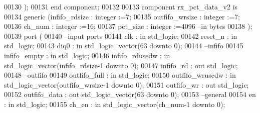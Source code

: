 \begin{DoxyCode}
00130         );
00131 \textcolor{keywordflow}{end} \textcolor{keywordflow}{component};
00132 
00133 \textcolor{keywordflow}{component} rx_pct_data_v2 \textcolor{keywordflow}{is}
00134   \textcolor{keywordflow}{generic} (infifo_rdsize  : \textcolor{comment}{integer} :=\textcolor{vhdllogic}{}\textcolor{vhdllogic}{7};
00135            outfifo_wrsize : \textcolor{comment}{integer} :=\textcolor{vhdllogic}{}\textcolor{vhdllogic}{7};
00136            ch_num         : \textcolor{comment}{integer} :=\textcolor{vhdllogic}{}\textcolor{vhdllogic}{16};
00137            pct_size       : \textcolor{comment}{integer} :=\textcolor{vhdllogic}{}\textcolor{vhdllogic}{4096}\textcolor{keyword}{ --in bytes}
00138             );
00139   \textcolor{keywordflow}{port} (
00140 \textcolor{keyword}{        --input ports }
00141         clk             : \textcolor{keywordflow}{in} \textcolor{comment}{std\_logic};
00142         reset_n         : \textcolor{keywordflow}{in} \textcolor{comment}{std\_logic};
00143         diq0            : \textcolor{keywordflow}{in} \textcolor{comment}{std\_logic\_vector}(\textcolor{vhdllogic}{}\textcolor{vhdllogic}{63} \textcolor{keywordflow}{downto} \textcolor{vhdllogic}{}\textcolor{vhdllogic}{0});
00144 \textcolor{keyword}{        --infifo}
00145         infifo_empty    : \textcolor{keywordflow}{in} \textcolor{comment}{std\_logic}; 
00146         infifo_rdusedw  : \textcolor{keywordflow}{in} \textcolor{comment}{std\_logic\_vector}(infifo_rdsize\textcolor{vhdlchar}{-}\textcolor{vhdllogic}{}\textcolor{vhdllogic}{1} \textcolor{keywordflow}{downto} \textcolor{vhdllogic}{}\textcolor{vhdllogic}{0});
00147         infifo_rd       : \textcolor{keywordflow}{out} \textcolor{comment}{std\_logic};
00148 \textcolor{keyword}{        --outfifo}
00149         outfifo_full    : \textcolor{keywordflow}{in} \textcolor{comment}{std\_logic}; 
00150         outfifo_wrusedw : \textcolor{keywordflow}{in} \textcolor{comment}{std\_logic\_vector}(outfifo_wrsize\textcolor{vhdlchar}{-}\textcolor{vhdllogic}{}\textcolor{vhdllogic}{1} \textcolor{keywordflow}{downto} \textcolor{vhdllogic}{}\textcolor{vhdllogic}{0});
00151         outfifo_wr      : \textcolor{keywordflow}{out} \textcolor{comment}{std\_logic};
00152         outfifo_data    : \textcolor{keywordflow}{out} \textcolor{comment}{std\_logic\_vector}(\textcolor{vhdllogic}{}\textcolor{vhdllogic}{63} \textcolor{keywordflow}{downto} \textcolor{vhdllogic}{}\textcolor{vhdllogic}{0});
00153 \textcolor{keyword}{        --general}
00154         en              : \textcolor{keywordflow}{in} \textcolor{comment}{std\_logic};
00155         ch_en           : \textcolor{keywordflow}{in} \textcolor{comment}{std\_logic\_vector}(ch_num\textcolor{vhdlchar}{-}\textcolor{vhdllogic}{}\textcolor{vhdllogic}{1} \textcolor{keywordflow}{downto} \textcolor{vhdllogic}{}\textcolor{vhdllogic}{0});

\end{DoxyCode}
